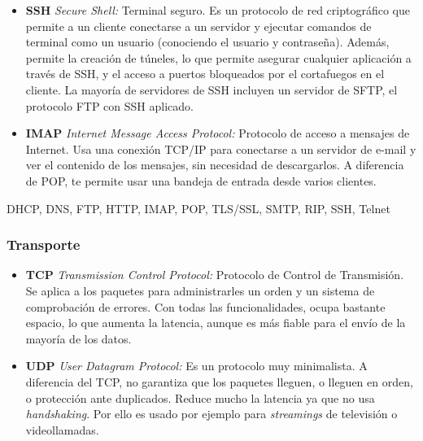 \documentclass[a4paper, 11pt]{report} %
\begin{document}
\begin{itemize}
\item \textbf{SSH} \textit{Secure Shell:} Terminal seguro. Es un protocolo de red criptográfico que permite a un cliente conectarse a un servidor y ejecutar comandos de terminal como un usuario (conociendo el usuario y contraseña). Además, permite la creación de túneles, lo que permite asegurar cualquier aplicación a través de SSH, y el acceso a puertos bloqueados por el cortafuegos en el cliente. La mayoría de servidores de SSH incluyen un servidor de SFTP, el protocolo FTP con SSH aplicado.
\item \textbf{IMAP} \textit{Internet Message Access Protocol:} Protocolo de acceso a mensajes de Internet. Usa una conexión TCP/IP para conectarse a un servidor de e-mail y ver el contenido de los mensajes, sin necesidad de descargarlos. A diferencia de POP, te permite usar una bandeja de entrada desde varios clientes.
\end{itemize}
DHCP, DNS, FTP, HTTP, IMAP, POP, TLS/SSL, SMTP, RIP, SSH, Telnet
\subsubsection{Transporte}
\begin{itemize}
\item \textbf{TCP} \textit{Transmission Control Protocol:} Protocolo de Control de Transmisión. Se aplica a los paquetes para administrarles un orden y un sistema de comprobación de errores. Con todas las funcionalidades, ocupa bastante espacio, lo que aumenta la latencia, aunque es más fiable para el envío de la mayoría de los datos.
\item \textbf{UDP} \textit{User Datagram Protocol:} Es un protocolo muy minimalista. A diferencia del TCP, no garantiza que los paquetes lleguen, o lleguen en orden, o protección ante duplicados. Reduce mucho la latencia ya que no usa \textit{handshaking}. Por ello es usado por ejemplo para \textit{streamings} de televisión o videollamadas.
\end{itemize}
\end{document}
